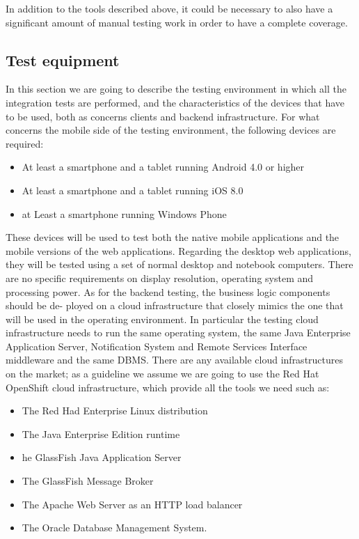 \documentclass{article}
\begin{document}
\begin{flushleft}
  
 In addition to the tools described above, it could be necessary to also have a  significant amount of manual testing work in order to have a complete coverage. 
  
  
  \newpage
  
  \subsection{Test equipment}
  
  In this section we are going to describe the testing environment in which all the integration tests are performed, and the characteristics of the devices that have to be used, both as concerns clients and backend infrastructure.
  For what concerns the mobile side of the testing environment, the following devices are required:
  \begin{itemize}
  \item At least a smartphone and a tablet running Android 4.0 or higher
  \item At least a smartphone and a tablet running iOS 8.0
  \item at Least a smartphone running Windows Phone
  
  
  
  \end{itemize}
  
  
  
These devices will be used to test both the native mobile applications and the mobile versions of the web applications.
  Regarding the desktop web applications, they will be tested using a set of normal desktop and notebook computers. There are no specific requirements on display resolution, operating system and processing power.
  As for the backend testing, the business logic components should be de- ployed on a cloud infrastructure that closely mimics the one that will be used in the operating environment.
  In particular the testing cloud infrastructure needs to run the same operating system, the same Java Enterprise Application Server, Notification System and Remote Services Interface middleware and the same DBMS.
  There are any available cloud infrastructures on the market; as a guideline we assume we are going to use the Red Hat OpenShift cloud infrastructure, which provide all the tools we need such as:
  \begin{itemize}
  \item The Red Had Enterprise Linux distribution
  \item The Java Enterprise Edition runtime
  \item he GlassFish Java Application Server
  \item The GlassFish Message Broker
  \item The Apache Web Server as an HTTP load balancer
  \item The Oracle Database Management System.
  

\end{itemize}
\end{flushleft}
\end{document}

